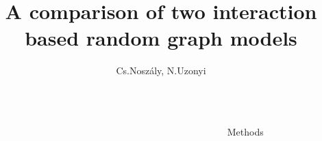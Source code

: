 \documentclass[final]{beamer}
\title{A comparison of two interaction based random graph models} %
\author{Cs.Noszály, N.Uzonyi} %
\institute{Faculty of Informatics, University of Debrecen} %
\newlength{\sepwid}
\newlength{\onecolwid}
\newlength{\twocolwid}
\begin{document}

\setlength{\belowcaptionskip}{2ex} %
\setlength\belowdisplayshortskip{2ex} %

\begin{frame}[t] %

\begin{columns}[t] %

\begin{column}{\sepwid}\end{column} %


\begin{column}{\twocolwid} %

\begin{columns}[t,totalwidth=\twocolwid] %

\begin{column}{\onecolwid}\vspace{-.6in} %







\end{column} %


\begin{column}{\onecolwid}\vspace{-.6in} %



  \begin{block}{Methods}
\end{block}

\end{column}

\end{columns} %


\end{column}
\end{columns}
\end{frame}
\end{document}
